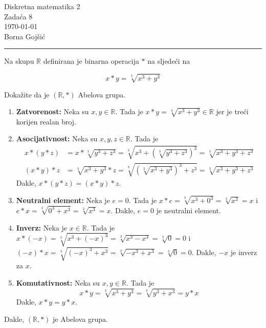 \documentclass{exam}
\def \brojZadace {8}
\begin{document}
\begingroup
\centering
\LARGE Diskretna matematika 2\\
\Large Zadaća \brojZadace\\
\large \today\\
\large Borna Gojšić\par
\endgroup
\rule{\textwidth}{0.4pt}
\pointsdroppedatright   %
\printanswers
\renewcommand{\solutiontitle}{\noindent\textbf{Rj:}\enspace}   %

\begin{questions}

\question Na skupu $\mathbb{R}$ definirana je binarna operacija $*$ na sljedeći na

\[
  x * y = \sqrt[3]{x^3 + y^3}
\]

Dokažite da je $(\mathbb{R}, *)$ Abelova grupa.

\begin{solution}
  \begin{enumerate}
    \item \textbf{Zatvorenost:} Neka su $x, y \in \mathbb{R}$. Tada je $x * y = \sqrt[3]{x^3 + y^3} \in \mathbb{R}$ jer je treći korijen realan broj.
    \item \textbf{Asocijativnost:} Neka su $x, y, z \in \mathbb{R}$. Tada je
      \begin{align*}
        x * (y * z) &= x * \sqrt[3]{y^3 + z^3} = \sqrt[3]{x^3 + \left( \sqrt[3]{y^3 + z^3} \right)^3} = \sqrt[3]{x^3 + y^3 + z^3} \\
        (x * y) * z &= \sqrt[3]{x^3 + y^3} * z = \sqrt[3]{\left( \sqrt[3]{x^3 + y^3} \right)^3 + z^3} = \sqrt[3]{x^3 + y^3 + z^3}
      \end{align*}
      Dakle, $x * (y * z) = (x * y) * z$.
    \item \textbf{Neutralni element:} Neka je $e = 0$. Tada je $x * e = \sqrt[3]{x^3 + 0^3} = \sqrt[3]{x^3} = x$ i $e * x = \sqrt[3]{0^3 + x^3} = \sqrt[3]{x^3} = x$. Dakle, $e = 0$ je neutralni element.
    \item \textbf{Inverz:} Neka je $x \in \mathbb{R}$. Tada je $x * (-x) = \sqrt[3]{x^3 + (-x)^3} = \sqrt[3]{x^3 - x^3} = \sqrt[3]{0} = 0$ i $(-x) * x = \sqrt[3]{(-x)^3 + x^3} = \sqrt[3]{-x^3 + x^3} = \sqrt[3]{0} = 0$. Dakle, $-x$ je inverz za $x$.
    \item \textbf{Komutativnost:} Neka su $x, y \in \mathbb{R}$. Tada je
      \[
        x * y = \sqrt[3]{x^3 + y^3} = \sqrt[3]{y^3 + x^3} = y * x
      \]
      Dakle, $x * y = y * x$.
  \end{enumerate}
  Dakle, $(\mathbb{R}, *)$ je Abelova grupa.
\end{solution}


\end{questions}
\end{document}
